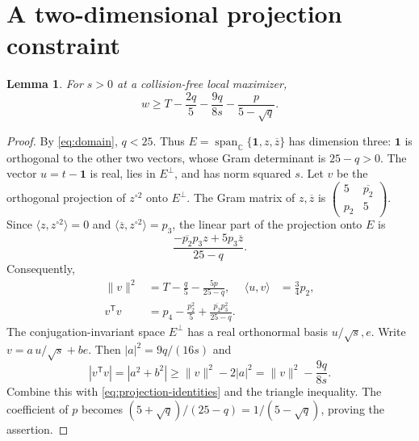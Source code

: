 \documentclass[11pt]{article}
\newtheorem{lemma}[theorem]{Lemma}
\theoremstyle{remark}
\newcommand{\C}{\mathbb C}
\newcommand{\one}{\mathbf 1}
\newcommand{\norm}[1]{\lVert#1\rVert}
\newcommand{\ip}[2]{\langle#1,#2\rangle}
\numberwithin{equation}{section}
\begin{document}
\section{A two-dimensional projection constraint}
\begin{lemma}\label{lem:projection}
For $s>0$ at a collision-free local maximizer,
\begin{equation}\label{eq:w-lower}
 w\ge T-\frac{2q}{5}-\frac{9q}{8s}-\frac{p}{5-\sqrt q}.
\end{equation}
\end{lemma}
\begin{proof}
By \eqref{eq:domain}, $q<25$.
Thus $E=\operatorname{span}_{\C}\{\one,z,\overline z\}$ has
dimension three: $\one$ is orthogonal to the other two vectors, whose
Gram determinant is $25-q>0$.
The vector $u=t-\one$ is real, lies in $E^\perp$, and has norm squared $s$.
Let $v$ be the orthogonal projection of $z^{\circ2}$ onto $E^\perp$.
The Gram matrix of $z,\overline z$ is
$\left(\begin{smallmatrix}5&\overline{p_2}\\p_2&5\end{smallmatrix}\right)$.
Since $\ip z {z^{\circ2}}=0$ and
$\ip{\overline z}{z^{\circ2}}=p_3$, the linear part of the
projection onto $E$ is
\[
 \frac{-\overline{p_2}p_3z+5p_3\overline z}{25-q}.
\]
Consequently,
\begin{equation}\label{eq:projection-identities}
\begin{aligned}
 \norm v^2&=T-\frac q5-\frac{5p}{25-q},&
 \ip u v&=\frac34p_2,\\
 v^{\mathsf T}v&=p_4-\frac{p_2^2}{5}
    +\frac{\overline{p_2}p_3^2}{25-q}.
\end{aligned}
\end{equation}
The conjugation-invariant space $E^\perp$ has a real orthonormal basis
$u/\sqrt s,e$. Write $v=a\,u/\sqrt s+b e$.
Then $|a|^2=9q/(16s)$ and
\[
 |v^{\mathsf T}v|=|a^2+b^2|
 \ge\norm v^2-2|a|^2
 =\norm v^2-\frac{9q}{8s}.
\]
Combine this with \eqref{eq:projection-identities} and the triangle
inequality. The coefficient of $p$ becomes
$(5+\sqrt q)/(25-q)=1/(5-\sqrt q)$, proving the assertion.
\end{proof}
\end{document}
